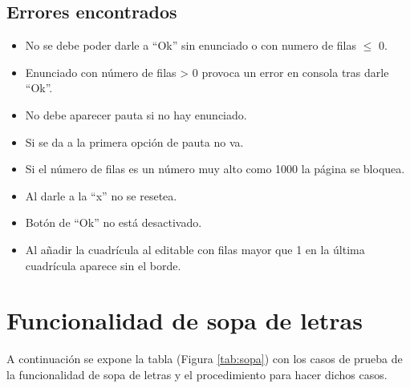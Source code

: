 \subsection{Errores encontrados}
\label{errores:desarrollo}
\begin{itemize}
    \item No se debe poder darle a ``Ok'' sin enunciado o con numero de filas $\leq$ 0.
    \item Enunciado con número de filas > 0 provoca un error en consola tras darle ``Ok''.
    \item No debe aparecer pauta si no hay enunciado.
    \item Si se da a la primera opción de pauta no va.
    \item Si el número de filas es un número muy alto como 1000 la página se bloquea.
    \item Al darle a la ``x'' no se resetea.
    \item Botón de ``Ok'' no está desactivado.
    \item  Al añadir la cuadrícula al editable con filas mayor que 1 en la última cuadrícula aparece sin el borde.

\end{itemize}

\section{Funcionalidad de sopa de letras}
\label{planPruebas:sopa}
A continuación se expone la tabla (Figura \ref{tab:sopa}) con los casos de prueba de la funcionalidad de sopa de letras y el procedimiento para hacer dichos casos.

